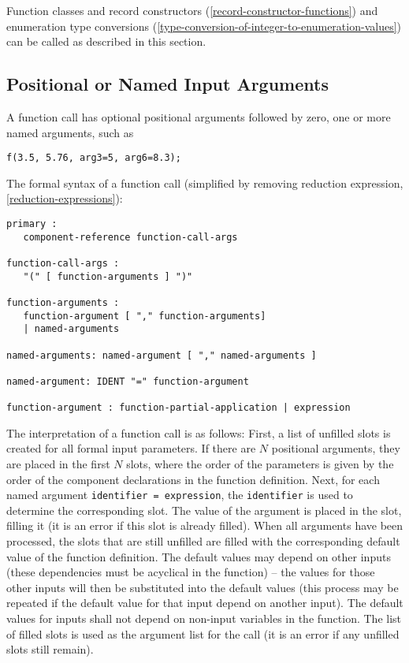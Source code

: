 Function classes and record constructors (\cref{record-constructor-functions}) and enumeration type
conversions (\cref{type-conversion-of-integer-to-enumeration-values}) can be called as described in this section.

\subsection{Positional or Named Input Arguments}\label{positional-or-named-input-arguments-of-functions}

A function call has optional positional arguments followed by zero, one
or more named arguments, such as

\begin{lstlisting}[language=modelica]
f(3.5, 5.76, arg3=5, arg6=8.3);
\end{lstlisting}

The formal syntax of a function call (simplified by removing reduction
expression, \cref{reduction-expressions}):
\begin{lstlisting}[language=grammar]
primary :
   component-reference function-call-args

function-call-args :
   "(" [ function-arguments ] ")"

function-arguments :
   function-argument [ "," function-arguments]
   | named-arguments

named-arguments: named-argument [ "," named-arguments ]

named-argument: IDENT "=" function-argument

function-argument : function-partial-application | expression
\end{lstlisting}

The interpretation of a function call is as follows: First, a list of unfilled slots is created for all formal input parameters.
If there are $N$ positional arguments, they are placed in the first $N$ slots, where the order of the parameters is given by the order of the component declarations in the function definition.
Next, for each named argument \lstinline!identifier = expression!, the \lstinline!identifier! is used to determine the corresponding slot.
The value of the argument is placed in the slot, filling it (it is an error if this slot is already filled).
When all arguments have been processed, the slots that are still unfilled are filled with the corresponding default value of the function definition.
The default values may depend on other inputs (these dependencies must be acyclical in the function) -- the values for those other inputs will then be substituted into the default values (this process may be repeated if the default value for that input depend on another input).
The default values for inputs shall not depend on non-input variables in the function.
The list of filled slots is used as the argument list for the call (it is an error if any unfilled slots still remain).

